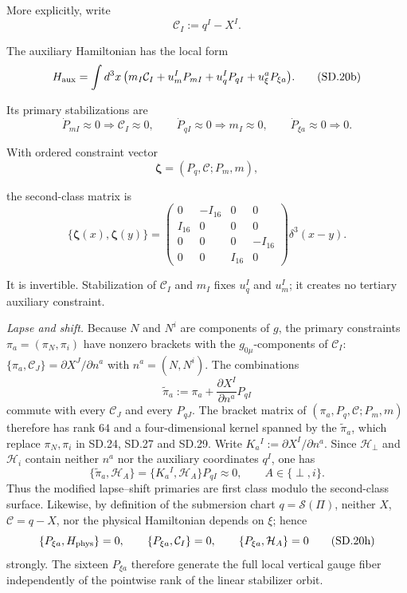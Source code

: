 \documentclass[10pt]{article}
\begin{document}
More explicitly, write
\[
\mathcal C_I:=q^I-X^I.
\tag{SD.20a}
\]
\par\noindent
The auxiliary Hamiltonian has the local form
\[
H_{\rm aux}=\int d^3x\,
\bigl(m_I\mathcal C_I
+u_m^IP_{mI}+u_q^IP_{qI}+u_\xi^aP_{\xi a}\bigr).
\tag{SD.20b}
\]
\par\noindent
Its primary stabilizations are
\[
\dot P_{mI}\approx0\Longrightarrow\mathcal C_I\approx0,
\qquad
\dot P_{qI}\approx0\Longrightarrow m_I\approx0,
\qquad
\dot P_{\xi a}\approx0\Longrightarrow0.
\tag{SD.20c}
\]
\par\noindent
With ordered constraint vector
\[
\boldsymbol\zeta=(P_q,\mathcal C;P_m,m),
\tag{SD.20d}
\]
\par\noindent
the second-class matrix is
\[
\{\boldsymbol\zeta(x),\boldsymbol\zeta(y)\}
=
\begin{pmatrix}
0&-I_{16}&0&0\\
I_{16}&0&0&0\\
0&0&0&-I_{16}\\
0&0&I_{16}&0
\end{pmatrix}\delta^3(x-y).
\tag{SD.20e}
\]
\par\noindent
It is invertible. Stabilization of $\mathcal C_I$ and $m_I$ fixes
$u_q^I$ and $u_m^I$; it creates no tertiary auxiliary constraint.

\par\noindent
\emph{Lapse and shift.} Because $N$ and $N^i$ are components of $g$, the
primary constraints $\pi_a=(\pi_N,\pi_i)$ have nonzero brackets with the
$g_{0\mu}$-components of $\mathcal C_I$:
$\{\pi_a,\mathcal C_J\}=\partial X^J/\partial n^a$ with $n^a=(N,N^i)$. The
combinations
\[
\tilde\pi_a:=\pi_a+\frac{\partial X^I}{\partial n^a}P_{qI}
\tag{SD.20f}
\]
commute with every $\mathcal C_J$ and every $P_{qJ}$. The bracket matrix of
$(\pi_a,P_q,\mathcal C;P_m,m)$ therefore has rank $64$ and a four-dimensional
kernel spanned by the $\tilde\pi_a$, which replace $\pi_N,\pi_i$ in SD.24,
SD.27 and SD.29. Write $K_a{}^I:=\partial X^I/\partial n^a$.  Since
$\mathcal H_\perp$ and $\mathcal H_i$ contain neither $n^a$ nor the auxiliary
coordinates $q^I$, one has
\[
\{\tilde\pi_a,\mathcal H_A\}
=\{K_a{}^I,\mathcal H_A\}P_{qI}\approx0,
\qquad A\in\{\perp,i\}.
\tag{SD.20g}
\]
Thus the modified lapse--shift primaries are first class modulo the
second-class surface.  Likewise, by definition of the submersion chart
$q=\mathscr S(\Pi)$, neither $X$, $\mathcal C=q-X$, nor the physical
Hamiltonian depends on $\xi$; hence
\[
\{P_{\xi a},H_{\rm phys}\}=0,
\qquad
\{P_{\xi a},\mathcal C_I\}=0,
\qquad
\{P_{\xi a},\mathcal H_A\}=0
\tag{SD.20h}
\]
strongly.  The sixteen $P_{\xi a}$ therefore generate the full local vertical
gauge fiber independently of the pointwise rank of the linear stabilizer
orbit.
\end{document}
